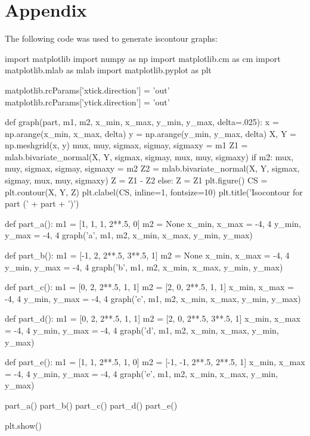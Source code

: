 \documentclass{article}
\begin{document}
\section*{Appendix}
The following code was used to generate iscontour graphs:
\begin{python}
import matplotlib
import numpy as np
import matplotlib.cm as cm
import matplotlib.mlab as mlab
import matplotlib.pyplot as plt

matplotlib.rcParams['xtick.direction'] = 'out'
matplotlib.rcParams['ytick.direction'] = 'out'

def graph(part, m1, m2, x_min, x_max, y_min, y_max, delta=.025):
    x = np.arange(x_min, x_max, delta)
    y = np.arange(y_min, y_max, delta)
    X, Y = np.meshgrid(x, y)
    mux, muy, sigmax, sigmay, sigmaxy = m1
    Z1 = mlab.bivariate_normal(X, Y, sigmax, sigmay, mux, muy, sigmaxy)
    if m2:
        mux, muy, sigmax, sigmay, sigmaxy = m2
        Z2 = mlab.bivariate_normal(X, Y, sigmax, sigmay, mux, muy, sigmaxy)
        Z = Z1 - Z2
    else:
        Z = Z1
    plt.figure()
    CS = plt.contour(X, Y, Z)
    plt.clabel(CS, inline=1, fontsize=10)
    plt.title('Isocontour for part (' + part + ')')

def part_a():
    m1 = [1, 1, 1, 2**.5, 0]
    m2 = None
    x_min, x_max = -4, 4
    y_min, y_max = -4, 4
    graph('a', m1, m2, x_min, x_max, y_min, y_max)

def part_b():
    m1 = [-1, 2, 2**.5, 3**.5, 1]
    m2 = None
    x_min, x_max = -4, 4
    y_min, y_max = -4, 4
    graph('b', m1, m2, x_min, x_max, y_min, y_max)

def part_c():
    m1 = [0, 2, 2**.5, 1, 1]
    m2 = [2, 0, 2**.5, 1, 1]
    x_min, x_max = -4, 4
    y_min, y_max = -4, 4
    graph('c', m1, m2, x_min, x_max, y_min, y_max)

def part_d():
    m1 = [0, 2, 2**.5, 1, 1]
    m2 = [2, 0, 2**.5, 3**.5, 1]
    x_min, x_max = -4, 4
    y_min, y_max = -4, 4
    graph('d', m1, m2, x_min, x_max, y_min, y_max)

def part_e():
    m1 = [1, 1, 2**.5, 1, 0]
    m2 = [-1, -1, 2**.5, 2**.5, 1]
    x_min, x_max = -4, 4
    y_min, y_max = -4, 4
    graph('e', m1, m2, x_min, x_max, y_min, y_max)

part_a()
part_b()
part_c()
part_d()
part_e()

plt.show()
\end{python}
\newpage
\end{document}
